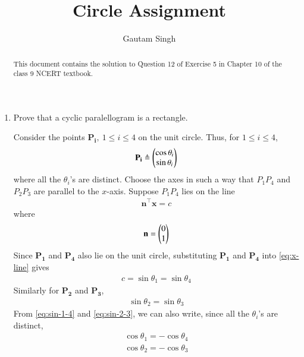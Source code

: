 \documentclass[journal,12pt,twocolumn]{IEEEtran}
\renewcommand{\vec}[1]{\boldsymbol{\mathbf{#1}}}
\begin{document}
\vspace{3cm}
\title{Circle Assignment}
\author{Gautam Singh}
\maketitle
\bigskip

\begin{abstract}
    This document contains the solution to Question 12 of 
    Exercise 5 in Chapter 10 of the class 9 NCERT textbook.
\end{abstract}

\begin{enumerate}
    \item Prove that a cyclic paralellogram is a rectangle.

    \solution Consider the points $\vec{P_i},\ 1 \le i \le 4$ on the 
    unit circle. Thus, for $1 \le i \le 4$,
    \begin{align}
        \vec{P_i} \triangleq \myvec{\cos\theta_i\\\sin\theta_i}
        \label{eq:vec-form}
    \end{align}
    where all the $\theta_i$'s are distinct. Choose the axes in such a way that 
    $P_1P_4$ and $P_2P_3$ are parallel to the $x$-axis. Suppose $P_1P_4$ lies 
    on the line
    \begin{align}
        \vec{n}^\top\vec{x} = c
        \label{eq:x-line}
    \end{align}
    where
    \begin{align}
        \vec{n} = \myvec{0\\1}
    \end{align}
    Since $\vec{P_1}$ and $\vec{P_4}$ also lie on the unit circle, substituting
    $\vec{P_1}$ and $\vec{P_4}$ into \eqref{eq:x-line} gives
    \begin{align}
        c = \sin\theta_1 = \sin\theta_4
        \label{eq:sin-1-4}
    \end{align}
    Similarly for $\vec{P_2}$ and $\vec{P_3}$,
    \begin{align}
        \sin\theta_2 = \sin\theta_3
        \label{eq:sin-2-3}
    \end{align}
    From \eqref{eq:sin-1-4} and \eqref{eq:sin-2-3}, we can also write, since 
    all the $\theta_i$'s are distinct,
    \begin{align}
        \cos\theta_1 = -\cos\theta_4 \label{eq:cos-1-4} \\
        \cos\theta_2 = -\cos\theta_3 \label{eq:cos-2-3}
    \end{align}

\end{enumerate}
\end{document}
